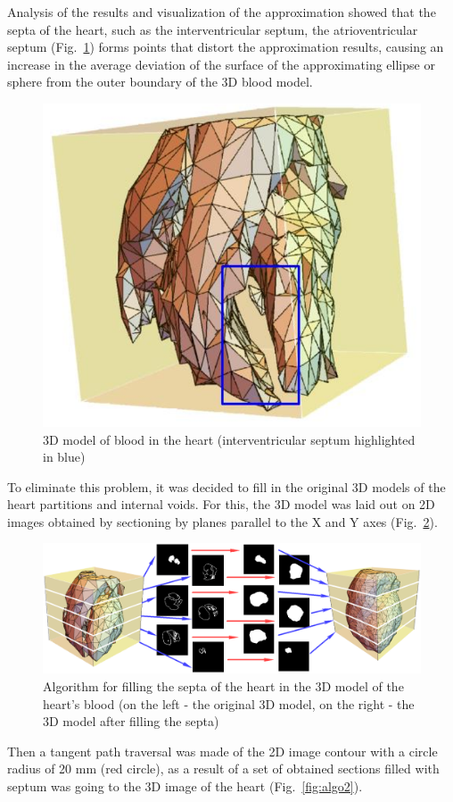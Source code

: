 \documentclass[conference]{IEEEtran}
\begin{document}
Analysis of the results and visualization of the approximation showed that the
septa of the heart, such as the interventricular septum, 
the atrioventricular septum (Fig.~\ref{fig:wall}) forms points that distort
the approximation results, causing an increase in the average deviation of the
surface of the approximating ellipse or sphere from the outer boundary of the 3D
blood model. 
\begin{figure}[tbph]
    \centering
    \includegraphics[width=0.8\linewidth]{fig/wall}
    \caption{3D model of blood in the heart (interventricular septum highlighted in blue)}
    \label{fig:wall}
\end{figure}
To eliminate this problem, it was decided to fill in the original 3D models of
the heart partitions and internal voids. For this, the 3D model was laid out on
2D images obtained by sectioning by planes parallel to the X and Y axes (Fig.~\ref{fig:algo}). 
\begin{figure}[tbph]
    \centering
    \includegraphics[width=\linewidth]{fig/algo}
    \caption{Algorithm for filling the septa of the heart in the 3D model of the heart's blood 
    (on the left - the original 3D model, on the right - the 3D model after filling the septa)}
    \label{fig:algo}
\end{figure}
Then a tangent path traversal was made of the 2D image contour with a circle radius of
20 mm (red circle), as a result of a set of obtained sections filled with septum
was going to the 3D image of the heart (Fig.~\ref{fig:algo2}).
\end{document}
